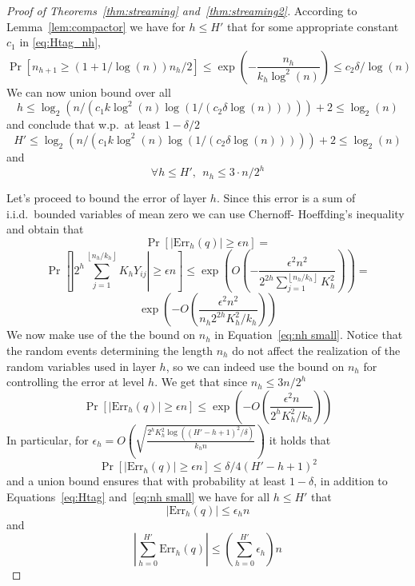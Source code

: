 \documentclass[anon,12pt]{colt2019} %
\newcommand{\eps}{\epsilon}
\newcommand{\floor}[1]{\left \lfloor #1 \right \rfloor}
\renewcommand{\Pr}{\operatorname{Pr}}
\begin{document}
\begin{proof} [Proof of Theorems~\ref{thm:streaming} and~\ref{thm:streaming2}]
According to Lemma~\ref{lem:compactor} we have for $ h\leq H'$ that for some appropriate constant $c_1$ in  \eqref{eq:Htag_nh},
$$ \Pr[n_{h+1} \geq (1+1/\log(n))n_{h}/2] \leq \exp\left( -\frac{n_{h}}{k_h \log^2(n)}  \right) \leq c_2\delta/  \log(n) $$
We can now union bound over all 
$$h \leq \log_2\left( n / \left( c_1 k \log^2(n) \log(1/(c_2 \delta\log(n))) \right)\right) + 2 \leq \log_2(n)$$
and conclude that w.p.\ at least $1-\delta/2$
\begin{equation} \label{eq:Htag}
H' \leq \log_2\left( n / \left( c_1 k \log^2(n) \log(1/(c_2 \delta \log(n))) \right)\right) + 2 \leq \log_2(n)
\end{equation}
and
\begin{equation} \label{eq:nh small}
\forall h \leq H', \ \ n_{h} \leq 3 \cdot n/2^{h}
\end{equation}


Let's proceed to bound the error of layer $h$. Since this error is a sum of i.i.d.\ bounded variables of mean zero we can use Chernoff- Hoeffding's inequality and obtain that
$$ \Pr\left[   \left| \text{Err}_h(q) \right| \geq \eps n \right] =$$
$$ \Pr\left[   \left| 2^h \sum_{j=1}^{\floor{n_h/k_h} } K_h Y_{ij} \right| \geq \eps n \right] \leq \exp \left( O\left( -\frac{ \eps^2 n^2}{ 2^{2h} \sum_{j=1}^{\floor{n_h/k_h} } K_h^2}   \right)\right) =$$
$$\exp \left( -O\left(\frac{\eps^2 n^2}{n_h 2^{2h} K_h^2/k_h  } \right) \right) 
$$
We now make use of the the bound on $n_h$ in Equation~\eqref{eq:nh small}. Notice that the random events determining the length $n_h$ do not affect the realization of the random variables used in layer $h$, so we can indeed use the bound on $n_h$ for controlling the error at level $h$. We get that since $n_h \leq 3n/2^h$
$$ \Pr\left[   \left| \text{Err}_h(q) \right| \geq \eps n \right] \leq 
\exp \left( -O\left(\frac{\eps^2 n}{ 2^h K_h^2/k_h  } \right) \right) 
$$
In particular, for $\eps_h = O\left( \sqrt{\frac{2^h K_h^2 \log((H'-h+1)^2/\delta)}{k_h n}} \right)$  it holds that
$$ \Pr\left[   \left| \text{Err}_h(q) \right| \geq \eps n \right] \leq \delta/4(H'-h+1)^2$$
and a union bound ensures that with probability at least $1-\delta$, in addition to Equations~\eqref{eq:Htag} and~\eqref{eq:nh small} we have for all $h \leq H'$ that
$$\left| \text{Err}_h(q) \right| \leq \eps_h n$$
and 
$$\left| \sum_{h=0}^{H'} \text{Err}_h(q) \right| \leq \left(\sum_{h=0}^{H'} \eps_h\right)n $$


\end{proof}
\end{document}
